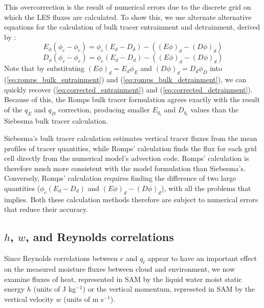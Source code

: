 \documentclass[draft,grl]{agutex}
\begin{document}
\begin{article}
This overcorrection is the result of numerical errors due to the discrete 
grid on which the LES fluxes are calculated.  To show this, we use alternate 
alternative equations for the calculation of bulk tracer entrainment and 
detrainment, derived by \cite{Romps2010}:
\begin{equation}
  \label{eq:romps_bulk_entrainment}
    E_{\phi}(\phi_c - \phi_e) = \phi_c(E_d-D_d) - ((E\phi)_d - (D\phi)_d)
\end{equation}
\begin{equation}
  \label{eq:romps_bulk_detrainment}
    D_{\phi}(\phi_c - \phi_e) = \phi_e(E_d-D_d) - ((E\phi)_d - (D\phi)_d)
\end{equation}
Note that by substituting $(E\phi)_d = E_d \phi_E$ and $(D\phi)_d = D_d \phi_D$ 
into (\ref{eq:romps_bulk_entrainment}) and (\ref{eq:romps_bulk_detrainment}),
we can quickly recover (\ref{eq:corrected_entrainment}) and 
(\ref{eq:corrected_detrainment}).  Because of this, the Romps bulk tracer 
formulation agrees exactly with the result of the $q_E$ and $q_D$ correction,
producing smaller $E_{q_t}$ and $D_{q_t}$ values than the Siebesma bulk tracer 
calculation.  

Siebesma's bulk tracer calculation estimates vertical tracer fluxes from the 
mean profiles of tracer quantities, while Romps' calculation finds the flux for 
each grid cell directly from the numerical model's advection code.  Romps' 
calculation is therefore much more consistent with the model formulation than 
Siebesma's.  Conversely, Romps' calculation requires finding the difference of 
two large quantities ($\phi_c(E_d-D_d)$ and $(E\phi)_d - (D\phi)_d$), with all 
the problems that implies.  Both these calculation methods therefore are 
subject to numerical errors that reduce their accuracy.  


\subsection{$h$, $w$, and Reynolds correlations}

Since Reynolds correlations between $e$ and $q_t$ appear to have an important 
effect on the measured moisture fluxes between cloud and environment, we now 
examine fluxes of heat, represented in SAM by the liquid water moist static 
energy $h$ (units of J kg$^{-1}$) or the vertical momentum, represeted in SAM 
by the vertical velocity $w$ (units of m s$^{-1}$).


\end{article}
\end{document}
